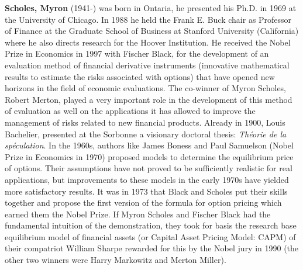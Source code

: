 \textbf{Scholes, Myron} (1941-) was born in Ontaria, he presented his Ph.D. in 1969 at the University of Chicago. In 1988 he held the Frank E. Buck chair as Professor of Finance at the Graduate School of Business at Stanford University (California) where he also directs research for the Hoover Institution. He received the Nobel Prize in Economics in 1997 with Fischer Black, for the development of an evaluation method of financial derivative instruments (innovative mathematical results to estimate the risks associated with options) that have opened new horizons in the field of economic evaluations. The co-winner of Myron Scholes, Robert Merton, played a very important role in the development of this method of evaluation as well on the applications it has allowed to improve the management of risks related to new financial products. Already in 1900, Louis Bachelier, presented at the Sorbonne a visionary doctoral thesis: \textit{Théorie de la spéculation}. In the 1960s, authors like James Boness and Paul Samuelson (Nobel Prize in Economics in 1970) proposed models to determine the equilibrium price of options. Their assumptions have not proved to be sufficiently realistic for real applications, but improvements to these models in the early 1970s have yielded more satisfactory results. It was in 1973 that Black and Scholes put their skills together and propose the first version of the formula for option pricing which earned them the Nobel Prize. If Myron Scholes and Fischer Black had the fundamental intuition of the demonstration, they took for basis the research base equilibrium model of financial assets (or Capital Asset Pricing Model: CAPM) of their compatriot William Sharpe rewarded for this by the Nobel jury in 1990 (the other two winners were Harry Markowitz and Merton Miller).

